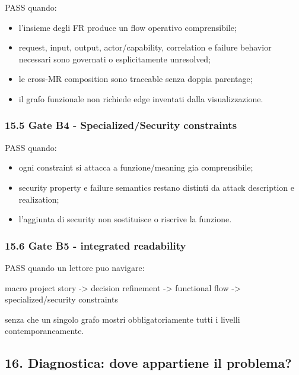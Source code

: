 \documentclass[
  9pt,
  a4paper,
]{article}
\newenvironment{Shaded}{}{}
\newcommand{\NormalTok}[1]{#1}
\providecommand{\tightlist}{%
  \setlength{\itemsep}{0pt}\setlength{\parskip}{0pt}}
\begin{document}
PASS quando:

\begin{itemize}
\tightlist
\item
  l'insieme degli FR produce un flow operativo comprensibile;
\item
  request, input, output, actor/capability, correlation e failure
  behavior necessari sono governati o esplicitamente unresolved;
\item
  le cross-MR composition sono traceable senza doppia parentage;
\item
  il grafo funzionale non richiede edge inventati dalla visualizzazione.
\end{itemize}

\subsubsection{15.5 Gate B4 - Specialized/Security
constraints}\label{gate-b4---specializedsecurity-constraints}

PASS quando:

\begin{itemize}
\tightlist
\item
  ogni constraint si attacca a funzione/meaning gia comprensibile;
\item
  security property e failure semantics restano distinti da attack
  description e realization;
\item
  l'aggiunta di security non sostituisce o riscrive la funzione.
\end{itemize}

\subsubsection{15.6 Gate B5 - integrated
readability}\label{gate-b5---integrated-readability}

PASS quando un lettore puo navigare:

\begin{Shaded}
\begin{Highlighting}[]
\NormalTok{macro project story}
\NormalTok{  {-}\textgreater{} decision refinement}
\NormalTok{  {-}\textgreater{} functional flow}
\NormalTok{  {-}\textgreater{} specialized/security constraints}
\end{Highlighting}
\end{Shaded}

senza che un singolo grafo mostri obbligatoriamente tutti i livelli
contemporaneamente.

\subsection{16. Diagnostica: dove appartiene il
problema?}\label{diagnostica-dove-appartiene-il-problema}
\end{document}
